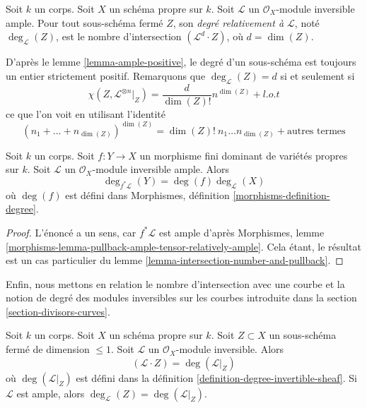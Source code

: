 \begin{definition}
\label{definition-degree}
Soit $k$ un corps. Soit $X$ un schéma propre sur $k$. Soit
$\mathcal{L}$ un $\mathcal{O}_X$-module inversible ample.
Pour tout sous-schéma fermé $Z$, son {\it degré relativement à
$\mathcal{L}$}, noté $\deg_\mathcal{L}(Z)$, est
le nombre d'intersection $(\mathcal{L}^d \cdot Z)$,
où $d = \dim(Z)$.
\end{definition}

\noindent
D'après le lemme \ref{lemma-ample-positive}, le degré d'un sous-schéma est toujours un
entier strictement positif. Remarquons que $\deg_\mathcal{L}(Z) = d$ si et seulement si
$$
\chi(Z, \mathcal{L}^{\otimes n}|_Z) = \frac{d}{\dim(Z)!} n^{\dim(Z)} + l.o.t
$$
ce que l'on voit en utilisant l'identité
$$
(n_1 + \ldots + n_{\dim(Z)})^{\dim(Z)} =
\dim(Z)!\ n_1 \ldots n_{\dim(Z)} + \text{autres termes}
$$

\begin{lemma}
\label{lemma-degree-finite-morphism-in-terms-degrees}
Soit $k$ un corps. Soit $f : Y \to X$ un morphisme fini
dominant de variétés propres sur $k$. Soit $\mathcal{L}$
un $\mathcal{O}_X$-module inversible ample.
Alors
$$
\deg_{f^*\mathcal{L}}(Y) = \deg(f) \deg_\mathcal{L}(X)
$$
où $\deg(f)$ est défini dans
Morphismes, définition \ref{morphisms-definition-degree}.
\end{lemma}

\begin{proof}
L'énoncé a un sens, car $f^*\mathcal{L}$ est ample d'après
Morphismes, lemme \ref{morphisms-lemma-pullback-ample-tensor-relatively-ample}.
Cela étant, le résultat est un cas particulier du
lemme \ref{lemma-intersection-number-and-pullback}.
\end{proof}

\noindent
Enfin, nous mettons en relation le nombre d'intersection avec une courbe et la notion
de degré des modules inversibles sur les courbes introduite dans la
section \ref{section-divisors-curves}.

\begin{lemma}
\label{lemma-intersection-numbers-and-degrees-on-curves}
Soit $k$ un corps. Soit $X$ un schéma propre sur $k$.
Soit $Z \subset X$ un sous-schéma fermé de dimension $\leq 1$.
Soit $\mathcal{L}$ un $\mathcal{O}_X$-module inversible.
Alors
$$
(\mathcal{L} \cdot Z) = \deg(\mathcal{L}|_Z)
$$
où $\deg(\mathcal{L}|_Z)$ est défini dans la
définition \ref{definition-degree-invertible-sheaf}.
Si $\mathcal{L}$ est ample, alors
$\deg_\mathcal{L}(Z) = \deg(\mathcal{L}|_Z)$.
\end{lemma}

